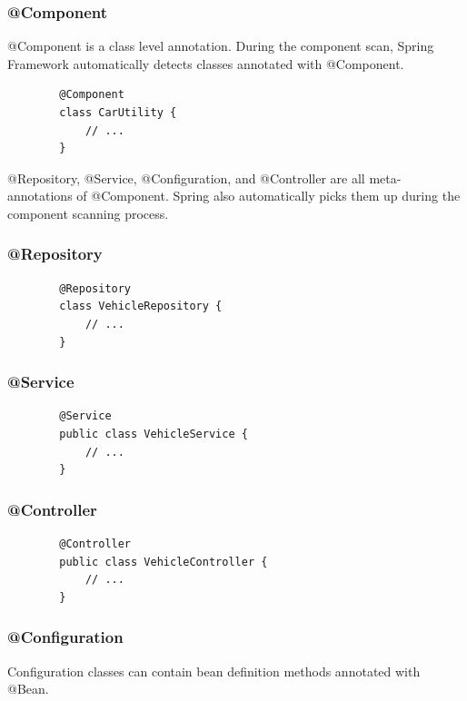 \documentclass{scrartcl}
\begin{document}
\subsubsection{@Component}

    @Component is a class level annotation. During the component scan, Spring Framework automatically detects classes annotated with @Component.

    \begin{lstlisting}
        @Component
        class CarUtility {
            // ...
        }
    \end{lstlisting}

    @Repository, @Service, @Configuration, and @Controller are all meta-annotations of @Component. Spring also automatically picks them up during the component scanning process.

\subsubsection{@Repository}

    \begin{lstlisting}
        @Repository
        class VehicleRepository {
            // ...
        }
    \end{lstlisting}

\subsubsection{@Service}

    \begin{lstlisting}
        @Service
        public class VehicleService {
            // ...
        }
    \end{lstlisting}

\subsubsection{@Controller}

    \begin{lstlisting}
        @Controller
        public class VehicleController {
            // ...
        }
    \end{lstlisting}

\subsubsection{@Configuration}

    Configuration classes can contain bean definition methods annotated with @Bean.
\end{document}

